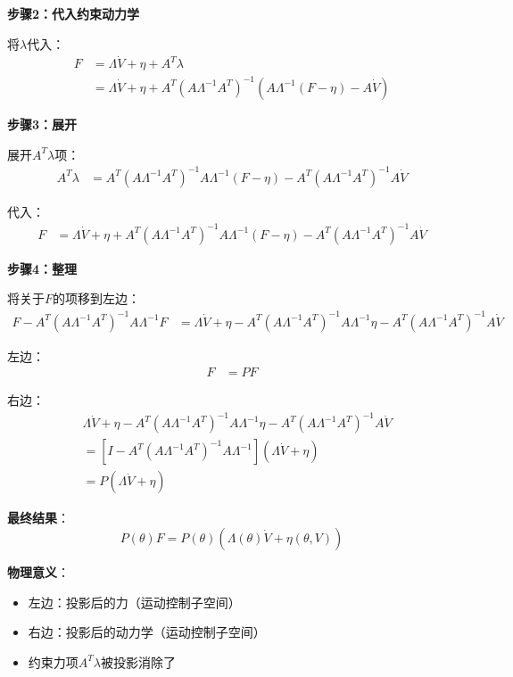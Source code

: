 \documentclass[12pt,a4paper]{article}
\begin{document}
\textbf{步骤2：代入约束动力学}

将$\lambda$代入：
\begin{align}
F &= \Lambda\dot{V} + \eta + A^T\lambda \\
  &= \Lambda\dot{V} + \eta + A^T(A\Lambda^{-1}A^T)^{-1}(A\Lambda^{-1}(F - \eta) - A\dot{V})
\end{align}

\textbf{步骤3：展开}

展开$A^T\lambda$项：
\begin{align}
A^T\lambda &= A^T(A\Lambda^{-1}A^T)^{-1}A\Lambda^{-1}(F - \eta) - A^T(A\Lambda^{-1}A^T)^{-1}A\dot{V}
\end{align}

代入：
\begin{align}
F &= \Lambda\dot{V} + \eta + A^T(A\Lambda^{-1}A^T)^{-1}A\Lambda^{-1}(F - \eta) - A^T(A\Lambda^{-1}A^T)^{-1}A\dot{V}
\end{align}

\textbf{步骤4：整理}

将关于$F$的项移到左边：
\begin{align}
F - A^T(A\Lambda^{-1}A^T)^{-1}A\Lambda^{-1}F &= \Lambda\dot{V} + \eta - A^T(A\Lambda^{-1}A^T)^{-1}A\Lambda^{-1}\eta - A^T(A\Lambda^{-1}A^T)^{-1}A\dot{V}
\end{align}

左边：
\begin{align}
[I - A^T(A\Lambda^{-1}A^T)^{-1}A\Lambda^{-1}]F &= PF
\end{align}

右边：
\begin{align}
&\Lambda\dot{V} + \eta - A^T(A\Lambda^{-1}A^T)^{-1}A\Lambda^{-1}\eta - A^T(A\Lambda^{-1}A^T)^{-1}A\dot{V} \\
&= [I - A^T(A\Lambda^{-1}A^T)^{-1}A\Lambda^{-1}](\Lambda\dot{V} + \eta) \\
&= P(\Lambda\dot{V} + \eta)
\end{align}

\textbf{最终结果}：
\begin{equation}
P(\theta)F = P(\theta)(\Lambda(\theta)\dot{V} + \eta(\theta, V)) \tag{11.61}
\end{equation}

\textbf{物理意义}：
\begin{itemize}
\item 左边：投影后的力（运动控制子空间）
\item 右边：投影后的动力学（运动控制子空间）
\item 约束力项$A^T\lambda$被投影消除了
\end{itemize}
\end{document}

